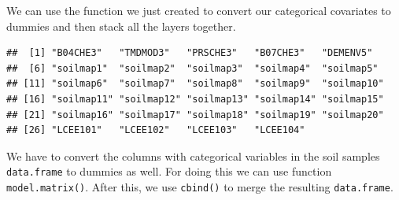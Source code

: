 \documentclass[10pt,b5paper,]{book}
\newenvironment{Shaded}{\begin{snugshade}}{\end{snugshade}}
\newcommand{\CommentTok}[1]{\textcolor[rgb]{0.56,0.35,0.01}{\textit{#1}}}
\newcommand{\KeywordTok}[1]{\textcolor[rgb]{0.13,0.29,0.53}{\textbf{#1}}}
\newcommand{\NormalTok}[1]{#1}
\newcommand{\OperatorTok}[1]{\textcolor[rgb]{0.81,0.36,0.00}{\textbf{#1}}}
\newcommand{\StringTok}[1]{\textcolor[rgb]{0.31,0.60,0.02}{#1}}
\theoremstyle{definition}
\theoremstyle{definition}
\theoremstyle{definition}
\theoremstyle{remark}
\begin{document}
We can use the function we just created to convert our categorical
covariates to dummies and then stack all the layers together.

\begin{Shaded}
\end{Shaded}

\begin{verbatim}
##  [1] "B04CHE3"   "TMDMOD3"   "PRSCHE3"   "B07CHE3"   "DEMENV5"  
##  [6] "soilmap1"  "soilmap2"  "soilmap3"  "soilmap4"  "soilmap5" 
## [11] "soilmap6"  "soilmap7"  "soilmap8"  "soilmap9"  "soilmap10"
## [16] "soilmap11" "soilmap12" "soilmap13" "soilmap14" "soilmap15"
## [21] "soilmap16" "soilmap17" "soilmap18" "soilmap19" "soilmap20"
## [26] "LCEE101"   "LCEE102"   "LCEE103"   "LCEE104"
\end{verbatim}

We have to convert the columns with categorical variables in the soil
samples \texttt{data.frame} to dummies as well. For doing this we can
use function \texttt{model.matrix()}. After this, we use
\texttt{cbind()} to merge the resulting \texttt{data.frame}.
\end{document}
